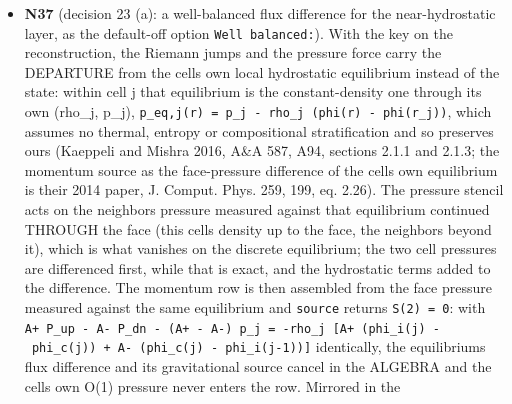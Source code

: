 \documentclass[english,a4paper]{my_memo}
\begin{document}
\begin{itemize}
  cannot reach: the DISCRETIZATION of the rows that bind. Advisor: rebuild on \texttt{build\_lwv}; \texttt{krylov\_and\_dogleg} 264/0, \texttt{steady\_species\_rows} 194/0; atomic reload at cap 40 with every hook off, 8 threads: the N31 ladder to the digit (7.607e-2 at 40, handed back 5.377e-2). Accepted; both arms stay off. \textbf{The linear algebra is exhausted as a lever} (N31 to N36: probe rule, inner tolerances, extended precision, band coverage, row scaling of the linear model, cycle length). STOPPED here for the user: decision 23, and the next question is the discretization of the species rows that bind at the front (the carrier row of cell 205 whose own diagonal is 3.3e3 below its hydrodynamic coupling). \texttt{code\_status\_20260910.md} section 5 task 1, ISSUES 3.1 and 5, the handoff and decision 23 restated accordingly.
\item
  \textbf{N37} (decision 23 (a): a well-balanced flux difference for the
  near-hydrostatic layer, as the default-off option \texttt{Well\ balanced:}).
  With the key on the reconstruction, the Riemann jumps and the pressure
  force carry the DEPARTURE from the cell\textquotesingle s own local hydrostatic
  equilibrium instead of the state: within cell j that equilibrium is the
  constant-density one through its own (rho\_j, p\_j),
  \texttt{p\_eq,j(r)\ =\ p\_j\ -\ rho\_j\ (phi(r)\ -\ phi(r\_j))}, which assumes no thermal,
  entropy or compositional stratification and so preserves ours (Kaeppeli
  and Mishra 2016, A\&A 587, A94, sections 2.1.1 and 2.1.3; the momentum
  source as the face-pressure difference of the cell\textquotesingle s own equilibrium is
  their 2014 paper, J. Comput. Phys. 259, 199, eq. 2.26). The pressure
  stencil acts on the neighbor\textquotesingle s pressure measured against that
  equilibrium continued THROUGH the face (this cell\textquotesingle s density up to the
  face, the neighbor\textquotesingle s beyond it), which is what vanishes on the discrete
  equilibrium; the two cell pressures are differenced first, while that is
  exact, and the hydrostatic terms added to the difference. The momentum
  row is then assembled from the face pressure measured against the same
  equilibrium and \texttt{source} returns \texttt{S(2)\ =\ 0}: with
  \texttt{A+\ P\_up\ -\ A-\ P\_dn\ -\ (A+\ -\ A-)\ p\_j\ =\ -rho\_j\ {[}A+\ (phi\_i(j)\ -\ phi\_c(j))\ +\ A-\ (phi\_c(j)\ -\ phi\_i(j-1)){]}} identically, the equilibrium\textquotesingle s flux
  difference and its gravitational source cancel in the ALGEBRA and the
  cell\textquotesingle s own O(1) pressure never enters the row. Mirrored in the

\end{itemize}
\end{document}
